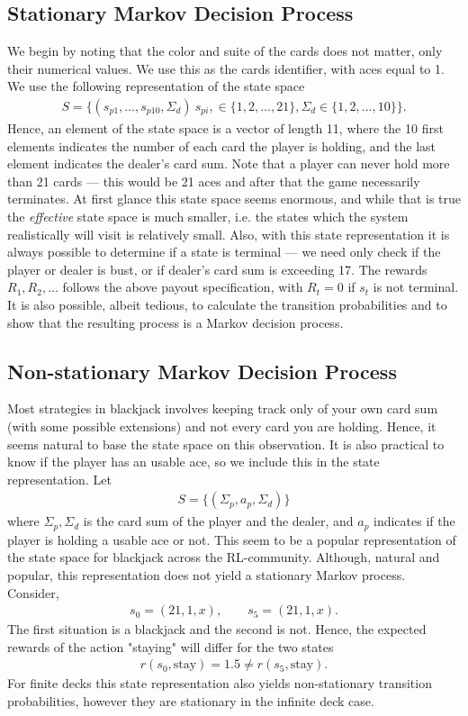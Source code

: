 \subsection*{Stationary Markov Decision Process}
We begin by noting that the color and suite of the cards does not matter, only their numerical values. We use this as the cards identifier, with aces equal to 1. We use the following representation of the state space
\begin{align*}
	S = \{  (s_{p1},\ldots,s_{p10},\Sigma_{d})\ s_{pi}, \in \{1,2,\ldots, 21 \}, \Sigma_{d}\in \{1,2,\ldots, 10 \} \}.
\end{align*}
Hence, an element of the state space is a vector of length 11, where the 10 first elements indicates the number of each card the player is holding, and the last element indicates the dealer's card sum.
Note that a player can never hold more than 21 cards --- this would be 21 aces and after that the game necessarily terminates. At first glance this state space seems enormous, and while that is true the \textit{effective} state space is much smaller, i.e. the states which the system realistically will visit is relatively small.  Also, with this state representation it is always possible to determine if a state is terminal --- we need only check if the player or dealer is bust, or if dealer's card sum is exceeding 17. The rewards $R_1,R_2,\ldots$ follows the above payout specification, with $R_t = 0$ if $s_t$ is not terminal.
It is also possible, albeit tedious, to calculate the transition probabilities and to show that the resulting process is a Markov decision process.

\subsection*{Non-stationary Markov Decision Process}
Most strategies in blackjack involves keeping track only of your own card sum (with some possible extensions) and not every card you are holding. Hence, it seems natural to base the state space on this observation. It is also practical to know if the player has an usable ace, so we include this in the state representation. Let
\begin{align*}
	S = \{  (\Sigma_p, a_p, \Sigma_d )  \}
\end{align*}
where $\Sigma_p,\Sigma_d$ is the card sum of the player and the dealer, and $a_p$ indicates if the player is holding a usable ace or not. This seem to be a popular representation of the state space for blackjack across the RL-community. Although, natural and popular, this representation does not yield a stationary Markov process. Consider,
\begin{align*}
	s_0 = (21, 1, x),\qquad s_5 = (21,1,x).
\end{align*}
The first situation is a blackjack and the second is not. Hence, the expected rewards of the action "staying" will differ for the two states
\begin{align*}
	r(s_0, \text{stay}) = 1.5 \neq r(s_5, \text{stay}). 
\end{align*}
For finite decks this state representation also yields non-stationary transition probabilities, however they are stationary in the infinite deck case.


